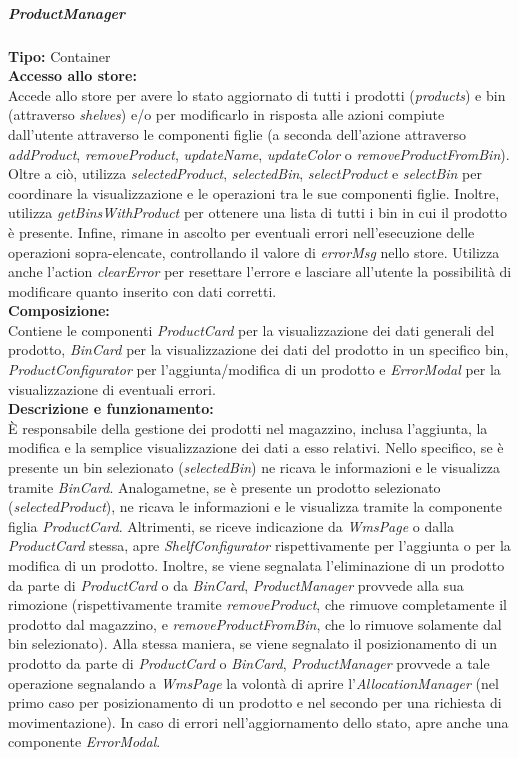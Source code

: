 \subparagraph{\colorbox{verde_uml}{ProductManager}}
\textbf{Tipo:} Container \\
\textbf{Accesso allo store:} \\
Accede allo store per avere lo stato aggiornato di tutti i prodotti (\textit{products}) e bin (attraverso \textit{shelves}) e/o per modificarlo in risposta alle azioni compiute dall'utente attraverso le componenti figlie (a seconda dell'azione attraverso \textit{addProduct}, \textit{removeProduct}, \textit{updateName}, \textit{updateColor} o \textit{removeProductFromBin}). Oltre a ciò, utilizza \textit{selectedProduct}, \textit{selectedBin}, \textit{selectProduct} e \textit{selectBin} per coordinare la visualizzazione e le operazioni tra le sue componenti figlie. Inoltre, utilizza \textit{getBinsWithProduct} per ottenere una lista di tutti i bin in cui il prodotto è presente. Infine, rimane in ascolto per eventuali errori nell'esecuzione delle operazioni sopra-elencate, controllando il valore di \textit{errorMsg} nello store. Utilizza anche l'action \textit{clearError} per resettare l'errore e lasciare all'utente la possibilità di modificare quanto inserito con dati corretti.
\\
\textbf{Composizione:} \\
Contiene le componenti \textit{ProductCard} per la visualizzazione dei dati generali del prodotto, \textit{BinCard} per la visualizzazione dei dati del prodotto in un specifico bin, \textit{ProductConfigurator} per l'aggiunta/modifica di un prodotto e \textit{ErrorModal} per la visualizzazione di eventuali errori.
\\
\textbf{Descrizione e funzionamento:} \\
È responsabile della gestione dei prodotti nel magazzino, inclusa l'aggiunta, la modifica e la semplice visualizzazione dei dati a esso relativi. 
Nello specifico, se è presente un bin selezionato (\textit{selectedBin}) ne ricava le informazioni e le visualizza tramite \textit{BinCard}. Analogametne, se è presente un prodotto selezionato (\textit{selectedProduct}), ne ricava le informazioni e le visualizza tramite la componente figlia \textit{ProductCard}. Altrimenti, se riceve indicazione da \textit{WmsPage} o dalla \textit{ProductCard} stessa, apre \textit{ShelfConfigurator} rispettivamente per l'aggiunta o per la modifica di un prodotto.  Inoltre, se viene segnalata l'eliminazione di un prodotto da parte di \textit{ProductCard} o da \textit{BinCard}, \textit{ProductManager} provvede alla sua rimozione (rispettivamente tramite \textit{removeProduct}, che rimuove completamente il prodotto dal magazzino, e \textit{removeProductFromBin}, che lo rimuove solamente dal bin selezionato). Alla stessa maniera, se viene segnalato il posizionamento di un prodotto da parte di \textit{ProductCard} o \textit{BinCard}, \textit{ProductManager} provvede a tale operazione segnalando a \textit{WmsPage} la volontà di aprire l'\textit{AllocationManager} (nel primo caso per posizionamento di un prodotto e nel secondo per una richiesta di movimentazione).
In caso di errori nell'aggiornamento dello stato, apre anche una componente \textit{ErrorModal}.

